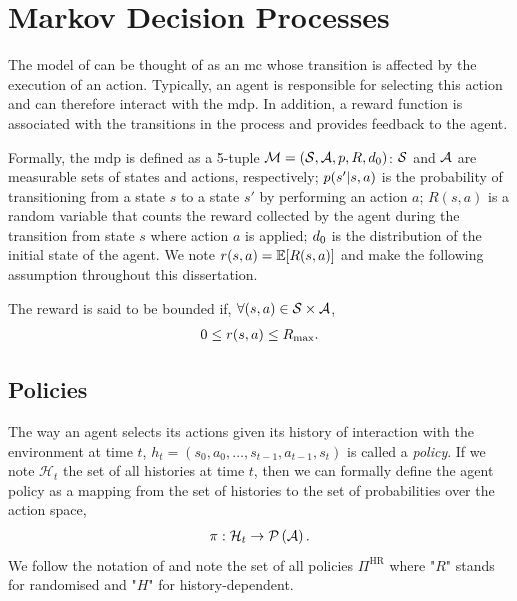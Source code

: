 \section{Markov Decision Processes}
\label{sec:mdp}

The model of  \cite{puterman1994markov} can be thought of as an \gls{mc} whose transition is affected by the execution of an action.
Typically, an agent is responsible for selecting this action and can therefore interact with the \gls{mdp}.
In addition, a reward function is associated with the transitions in the process and provides feedback to the agent.

Formally, the \gls{mdp} is defined as a 5-tuple $\mathcal{M} = (\mathcal{S},\mathcal{A}, p, R, d_0)$: $\mathcal{S} $ and $\mathcal{A}$ are measurable sets of states and actions, respectively; $p(s'\vert s,a)$ is the probability of transitioning from a state $s$ to a state $s'$ by performing an action $a$; $R(s,a)$ is a random variable that counts the reward collected by the agent during the transition from state $s$ where action $a$ is applied; $d_0$ is the distribution of the initial state of the agent. 
We note $r(s,a)=\operatorname*{\mathbb{E}}[R(s,a)]$ and make the following assumption throughout this dissertation.

\begin{ass}
    The reward is said to be bounded if, $\forall (s,a)\in\mathcal{S}\times\mathcal{A}$,
    \begin{align*}
        0\le r(s,a)\le {R_{\max}}.
    \end{align*}
\end{ass}


\subsection{Policies}
\label{subsec:policies}
The way an agent selects its actions given its history of interaction with the environment at time $t$,  $h_t=(s_0,a_0,\dots,s_{t-1},a_{t-1},s_t)$ is called a \emph{policy}. 
If we note $\mathcal{H}_t$ the set of all histories at time $t$, then we can formally define the agent policy as a mapping from the set of histories to the set of probabilities over the action space,
\begin{align*}
    \pi:\mathcal{H}_t\rightarrow\mathcal{P}\left(\mathcal{A}\right).
\end{align*}
We follow the notation of \cite{puterman1994markov} and note the set of all policies $\Pi^{\text{HR}}$ where "$R$" stands for randomised and "$H$" for history-dependent.

